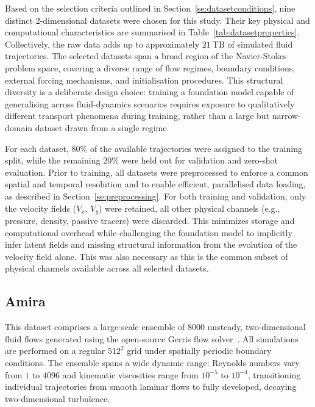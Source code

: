 Based on the selection criteria outlined in Section~\ref{se:datasetconditions}, nine distinct 2-dimensional datasets were chosen for this study. Their key physical and computational characteristics are summarised in Table~\ref{tab:datasetproperties}. Collectively, the raw data adds up to approximately $21~\text{TB}$ of simulated fluid trajectories. The selected datasets span a broad region of the Navier-Stokes problem space, covering a diverse range of flow regimes, boundary conditions, external forcing mechanisms, and initialisation procedures. This structural diversity is a deliberate design choice: training a foundation model capable of generalising across fluid-dynamics scenarios requires exposure to qualitatively different transport phenomena during training, rather than a large but narrow-domain dataset drawn from a single regime. 
 


For each dataset, $80\%$ of the available trajectories were assigned to the training split, while the remaining $20\%$ were held out for validation and zero-shot evaluation. Prior to training, all datasets were preprocessed to enforce a common spatial and temporal resolution and to enable efficient, parallelised data loading, as described in Section~\ref{se:preprocessing}. For both training and validation, only the velocity fields ($V_x$, $V_y$) were retained, all other physical channels (e.g., pressure, density, passive tracers) were discarded. This minimizes storage and computational overhead while challenging the foundation model to implicitly infer latent fields and missing structural information from the evolution of the velocity field alone. This was also necessary as this is the common subset of physical channels available across all selected datasets.
 
\subsection{Amira}
\label{ss:amiraset}
 
This dataset comprises a large-scale ensemble of $8000$ unsteady, two-dimensional fluid flows generated using the open-source Gerris flow solver~\citep{Jakob2021FluidFlowDataset}. All simulations are performed on a regular $512^2$ grid under spatially periodic boundary conditions. The ensemble spans a wide dynamic range: Reynolds numbers vary from $1$ to $4096$ and kinematic viscosities range from $10^{-5}$ to $10^{-4}$, transitioning individual trajectories from smooth laminar flows to fully developed, decaying two-dimensional turbulence. 

